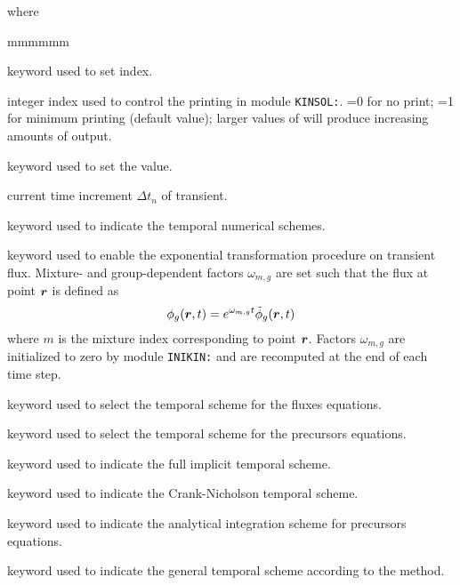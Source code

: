\noindent where
\begin{ListeDeDescription}{mmmmmm}

\item[\moc{EDIT}] keyword used to set  index.

\item[\dusa{iprint}] integer index used to control  the printing in module {\tt KINSOL:}.
=0 for no print; =1 for minimum printing (default value); larger values of 
will produce increasing amounts of output.

\item[\moc{DELTA}] keyword used to set the  value.

\item[\dusa{delta}] current time increment $\Delta t_n$ of transient.

\item[\moc{SCHEME}] keyword used to indicate the temporal numerical schemes.

\item[\moc{TEXP}] keyword used to enable the exponential transformation procedure on transient flux. Mixture- and group-dependent
factors $\omega_{m,g}$ are set such that the flux at point $\bff(r)$ is defined as
\begin{equation}
\phi_g(\bff(r),t)=e^{\omega_{m,g} t} \tilde\phi_g(\bff(r),t)
\label{eq:eq_kinsol_1}
\end{equation}
\noindent where $m$ is the mixture index corresponding to point $\bff(r)$. Factors $\omega_{m,g}$ are initialized to zero by module
{\tt INIKIN:} and are recomputed at the end of each time step.

\item[\moc{FLUX}] keyword used to select the temporal scheme for the fluxes equations.

\item[\moc{PREC}] keyword used to select the temporal scheme for the precursors equations.

\item[\moc{IMPLIC}] keyword used to indicate the full implicit temporal scheme.

\item[\moc{CRANK}] keyword used to indicate the Crank-Nicholson temporal scheme.

\item[\moc{EXPON}] keyword used to indicate the analytical integration scheme for precursors equations.

\item[\moc{THETA}] keyword used to indicate the general temporal scheme according to the
 method.


\end{ListeDeDescription}
